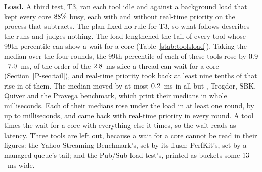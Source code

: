 \documentclass[10pt,journal,onecolumn]{IEEEtran}
\begin{document}
\textbf{Load.} A third test, T3, ran each tool idle and against a background load that kept every
core $\toolsLoadPct\%$ busy, each with and without real-time priority on the process that
subtracts. The plan fixed no rule for T3, so what follows describes the runs and judges nothing.
The load lengthened the tail of every tool whose 99th percentile can show a wait for a core
(Table~\ref{stab:toolsload}). Taking the median over the four rounds, the 99th percentile of each of
these \toolsTailToolsWord{} tools rose by $0.9$--$7.0$~ms, of the order of
the $2.8$~ms slice a thread can wait for a core (Section~\ref{P-sec:tail}), and real-time
priority took back at least nine tenths of that rise in \toolsTailBackWord{} of them. The median
moved by at most $0.2$~ms in all but \toolsWholeMsWord{}, Trogdor, SBK, Quiver and
the Pravega benchmark, which print their medians in whole milliseconds. Each of their medians rose
under the load in at least one round, by up to \toolsWholeStepsHi{} milliseconds, and came back
with real-time priority in every round. A tool times the wait for a core with everything else it
times, so the wait reads as latency. Three tools are left out, because a wait for a core cannot be
read in their figures: the Yahoo Streaming Benchmark's, set by its flush; PerfKit's, set by a
managed queue's tail; and the Pub/Sub load test's, printed as buckets some
$13$~ms wide.

\begin{table}[tb]
\caption{\textbf{On a busy machine every listed tool's tail lengthened, and its median barely moved
in all but \toolsWholeMsWord{}.} T3: each tool idle and with every core $\toolsLoadPct\%$ busy;
real-time: the process that subtracts ran ahead of the load at real-time priority. Each figure is a
cell's median over the four rounds, in milliseconds; the text's changes compare the cells within
each round.}
\label{stab:toolsload}
\centering
\footnotesize

\end{table}
\end{document}
